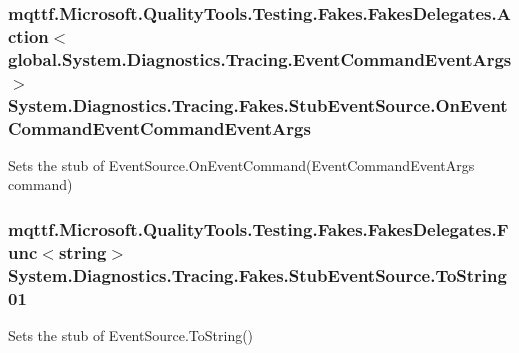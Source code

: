 \hypertarget{class_system_1_1_diagnostics_1_1_tracing_1_1_fakes_1_1_stub_event_source_a0af612a99654866d89cd26007dc2cefa}{
\subsubsection[{On\-Event\-Command\-Event\-Command\-Event\-Args}]{\setlength{\rightskip}{0pt plus 5cm}mqttf.\-Microsoft.\-Quality\-Tools.\-Testing.\-Fakes.\-Fakes\-Delegates.\-Action$<$global.\-System.\-Diagnostics.\-Tracing.\-Event\-Command\-Event\-Args$>$ System.\-Diagnostics.\-Tracing.\-Fakes.\-Stub\-Event\-Source.\-On\-Event\-Command\-Event\-Command\-Event\-Args}}\label{class_system_1_1_diagnostics_1_1_tracing_1_1_fakes_1_1_stub_event_source_a0af612a99654866d89cd26007dc2cefa}


Sets the stub of Event\-Source.\-On\-Event\-Command(\-Event\-Command\-Event\-Args command)

\hypertarget{class_system_1_1_diagnostics_1_1_tracing_1_1_fakes_1_1_stub_event_source_a1b0d566393bda81576ad7ab6325a532d}{
\subsubsection[{To\-String01}]{\setlength{\rightskip}{0pt plus 5cm}mqttf.\-Microsoft.\-Quality\-Tools.\-Testing.\-Fakes.\-Fakes\-Delegates.\-Func$<$string$>$ System.\-Diagnostics.\-Tracing.\-Fakes.\-Stub\-Event\-Source.\-To\-String01}}\label{class_system_1_1_diagnostics_1_1_tracing_1_1_fakes_1_1_stub_event_source_a1b0d566393bda81576ad7ab6325a532d}


Sets the stub of Event\-Source.\-To\-String()



